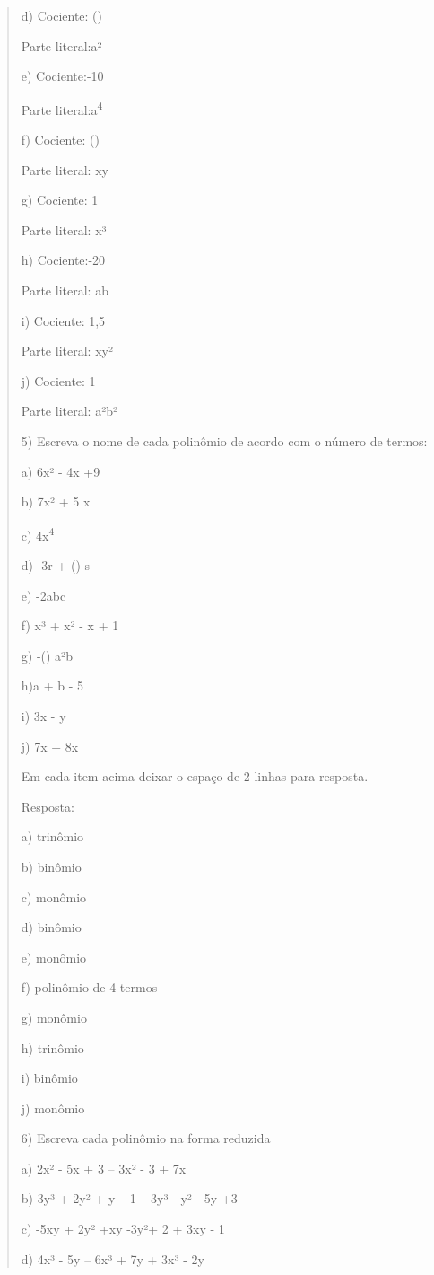 \begin{quote}
\begin{escolha}
d) Cociente: ()

Parte literal:a²

e) Cociente:-10

Parte literal:a\textsuperscript{4}

f) Cociente: ()

Parte literal: xy

g) Cociente: 1

Parte literal: x³

h) Cociente:-20

Parte literal: ab

i) Cociente: 1,5

Parte literal: xy²

j) Cociente: 1

Parte literal: a²b²

5) Escreva o nome de cada polinômio de acordo com o número de termos:

a) 6x² - 4x +9

b) 7x² + 5 x

c) 4x\textsuperscript{4}

d) -3r + () s

e) -2abc

f) x³ + x² - x + 1

g) -() a²b

h)a + b - 5

i) 3x - y

j) 7x + 8x

Em cada item acima deixar o espaço de 2 linhas para resposta.

Resposta:

a) trinômio

b) binômio

c) monômio

d) binômio

e) monômio

f) polinômio de 4 termos

g) monômio

h) trinômio

i) binômio

j) monômio

6) Escreva cada polinômio na forma reduzida

a) 2x² - 5x + 3 -- 3x² - 3 + 7x

b) 3y³ + 2y² + y -- 1 -- 3y³ - y² - 5y +3

c) -5xy + 2y² +xy -3y²+ 2 + 3xy - 1

d) 4x³ - 5y -- 6x³ + 7y + 3x³ - 2y


\end{escolha}
\end{quote}
